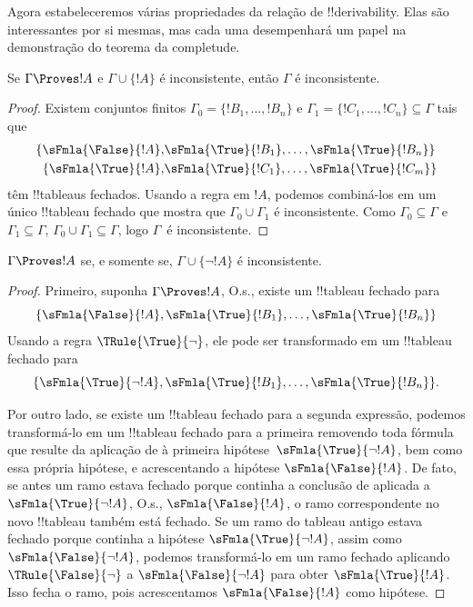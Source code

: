 \documentclass[../../../include/open-logic-section]{subfiles}
\begin{document}
      {}
      {}


Agora estabeleceremos várias propriedades da relação de
!!{derivability}. Elas são interessantes por si mesmas, mas cada uma
desempenhará um papel na demonstração do teorema da completude.

\begin{prop}
  Se $\Gamma \Proves !A$ e $\Gamma \cup \{!A\}$ é inconsistente,
  então $\Gamma$ é inconsistente.
\end{prop}

\begin{proof}
Existem conjuntos finitos $\Gamma_0 = \{!B_1, \dots, !B_n\}$ e $\Gamma_1
  =\{!C_1, \dots, !C_n\} \subseteq \Gamma$ tais que
  \begin{align*}
    \{\sFmla{\False}{!A}, &
    \sFmla{\True}{!B_1}, \dots, \sFmla{\True}{!B_n}\} \\
    \{\sFmla{\True}{!A}, &
    \sFmla{\True}{!C_1}, \dots, \sFmla{\True}{!C_m}\}
  \end{align*}
  têm !!{tableau}s fechados. Usando a regra \Cut{} em $!A$, podemos
  combiná-los em um único !!{tableau} fechado que mostra que $\Gamma_0
  \cup \Gamma_1$ é inconsistente. Como $\Gamma_0
  \subseteq \Gamma$ e $\Gamma_1 \subseteq \Gamma$, $\Gamma_0 \cup
  \Gamma_1 \subseteq \Gamma$, logo $\Gamma$~é inconsistente.
\end{proof}

\begin{prop}
$\Gamma \Proves !A$ se, e somente se, $\Gamma \cup \{\lnot !A\}$ é
inconsistente.
\end{prop}

\begin{proof}
Primeiro, suponha $\Gamma \Proves !A$, O.s.\@, existe um
!!{tableau} fechado para
\[
\{\sFmla{\False}{!A},
\sFmla{\True}{!B_1}, \dots, \sFmla{\True}{!B_n}\}
\]
Usando a regra $\TRule{\True}{\lnot}$, ele pode ser transformado em um
!!{tableau} fechado para
\[
\{\sFmla{\True}{\lnot !A},
\sFmla{\True}{!B_1}, \dots, \sFmla{\True}{!B_n}\}.
\]

Por outro lado, se existe um !!{tableau} fechado para a segunda expressão,
podemos transformá-lo em um !!{tableau} fechado para a primeira removendo
toda fórmula que resulte da aplicação de \TRule{\True}{\lnot} à primeira
hipótese~$\sFmla{\True}{\lnot !A}$, bem como essa própria hipótese, e
acrescentando a hipótese $\sFmla{\False}{!A}$. De fato, se antes um ramo
estava fechado porque continha a conclusão de \TRule{\True}{\lnot}
aplicada a $\sFmla{\True}{\lnot !A}$, O.s.\@, $\sFmla{\False}{!A}$, o
ramo correspondente no novo !!{tableau} também está fechado. Se um ramo
do tableau antigo estava fechado porque continha a hipótese
$\sFmla{\True}{\lnot !A}$, assim como $\sFmla{\False}{\lnot !A}$,
podemos transformá-lo em um ramo fechado aplicando
$\TRule{\False}{\lnot}$ a $\sFmla{\False}{\lnot !A}$ para obter
$\sFmla{\True}{!A}$. Isso fecha o ramo, pois acrescentamos
$\sFmla{\False}{!A}$ como hipótese.
\end{proof}
\end{document}
